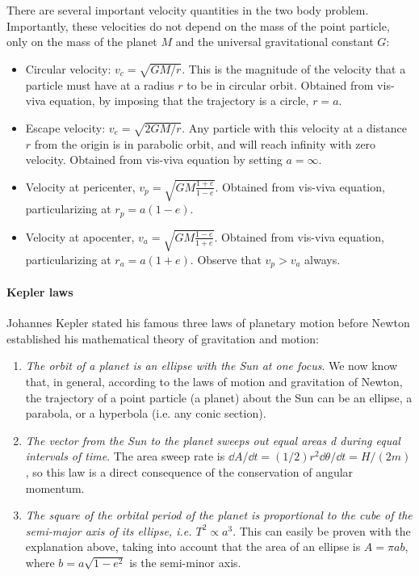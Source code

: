 There are several important velocity quantities in the two body problem. 
Importantly, these velocities do not depend on the mass of the point particle, 
only on the mass of the planet $M$ and the universal gravitational constant 
$G$:
%
\begin{itemize}
\item Circular velocity: $v_c=\sqrt{GM/r}$. This is the magnitude of the 
velocity that a particle must have at a radius $r$ to be in circular orbit. 
Obtained from vis-viva equation, by imposing that the trajectory is a circle, 
$r=a$. 
\item Escape velocity: $v_e=\sqrt{2GM/r}$. Any particle with this velocity at 
a distance $r$ from the origin is in parabolic orbit, and will reach infinity
with zero velocity. Obtained from vis-viva equation by setting $a=\infty$.
\item Velocity at pericenter, $v_p=\sqrt{GM\frac{1+e}{1-e}}$. Obtained from 
vis-viva equation, particularizing at $r_p=a(1-e)$.
\item Velocity at apocenter, $v_a=\sqrt{GM\frac{1-e}{1+e}}$. Obtained from 
vis-viva equation, particularizing at $r_a=a(1+e)$. Observe that $v_p>v_a$ 
always.
\end{itemize}
%

\paragraph{Kepler laws}

Johannes Kepler stated his famous three laws of planetary motion before
Newton established his mathematical theory of gravitation and motion:
%
\begin{enumerate}

\item \emph{The orbit of a planet is  an ellipse with the Sun at one focus}.
We now know that, in general, according to the laws of motion and gravitation
of Newton, the trajectory of a point particle (a planet) about the Sun can be
an ellipse, a parabola, or a hyperbola (i.e. any conic section).
    
\item \emph{The vector from the Sun to the planet sweeps out equal areas d
during equal intervals of time}. The area sweep rate is $\dd A /\dd t =
(1/2)r^2 \dd\theta /\dd t = H/(2m)$, so this law is a direct consequence of
the conservation of angular momentum.

\item \emph{The square of the orbital period of the planet is proportional to
the cube of the semi-major axis of its ellipse, i.e. $T^2 \propto a^3$}. This
can easily be proven with the explanation above, taking into account that the
area of an ellipse is $A=\pi a b$, where $b=a\sqrt{1-e^2}$ is the semi-minor
axis.

\end{enumerate}





